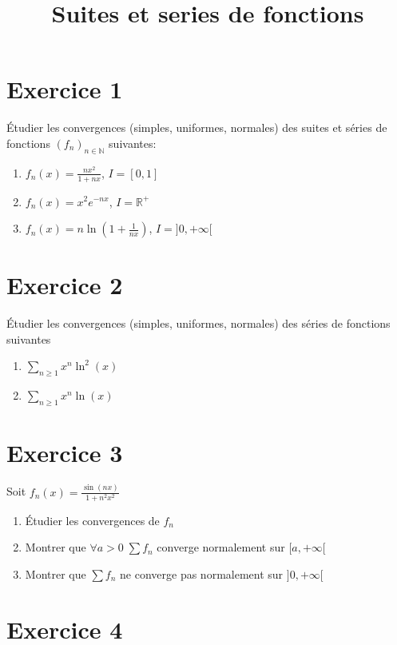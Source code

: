 \documentclass[11pt]{article}
\author{\Name \texttt{\Login}}
\date{}
\title{Suites et series de fonctions}
\begin{document}
\maketitle

\section*{Exercice 1}

Étudier les convergences (simples, uniformes, normales) des suites et séries de fonctions $(f_n)_{n\in\mathbb{N}}$ suivantes:

\begin{enumerate}
\item $ f_n(x)=\frac{nx^2}{1+nx}$, $I=[0,1]$
\item $ f_n(x)=x^2 e^{-nx}$, $I=\mathbb{R^{+}}$
\item $ f_n(x)= n\ln(1+\frac{1}{nx})$, $I=]0,+\infty[$

\end{enumerate}

\section*{Exercice 2}

Étudier les convergences (simples, uniformes, normales) des séries de fonctions suivantes

\begin{enumerate}
\item $\sum_{n\geq1} x^n\ln^2(x)$
\item $\sum_{n\geq1} x^n\ln(x)$
\end{enumerate}

\section*{Exercice 3}

Soit $f_n(x)=\frac{\sin(nx)}{1+n^2x^2}$

\begin{enumerate}
\item Étudier les convergences de $f_n$
\item Montrer que $\forall a>0 \;\sum f_n$ converge normalement sur $[a, +\infty[$
\item Montrer que $ \sum f_n$ ne converge pas normalement sur $]0, +\infty[$
\end{enumerate}

\section*{Exercice 4}
\end{document}
